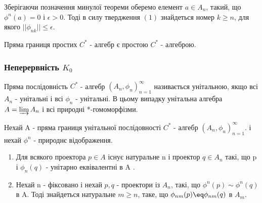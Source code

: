 \begin{remark}
    Зберігаючи позначення минулої теореми оберемо елемент $a \in A_n$, такий, що $\phi^n(a) = 0$ і $\epsilon > 0$.
    Тоді в силу твердження $(1)$ знайдеться номер $k \geq n$, для якого $||\phi_{nk}|| \leq \epsilon$.
\end{remark}

\begin{theorem}
    Пряма границя простих $C^*$ - алгебр є простою $C^*$ - алгеброю.
\end{theorem}

\subsubsection{Неперервність $K_0$}

Пряма послідовність $C^*$ - алгебр $(A_n, \phi_n)_{n=1}^{\infty}$ називається унітальною, якщо всі $A_n$ - унітальні
і всі $\phi_n$ - унітальні.
В цьому випадку унітальна алгебра $A = \varinjlim A_n$ і всі природні *-гомоморфізми.

\begin{lemma}
    Нехай A - пряма границя унітальної послідовності $C^*$ - алгебр $(A_n, \phi_n)_{n=1}^{\infty}$.
    і нехай $\phi^n$ - природнє відображення.
    \begin{enumerate}
        \item Для всякого проектора $p \in A$ існує натуральне n і проектор $q \in A_n$ такі,
        що p і $\phi_n(q)$ - унітарно еквівалентні в A .
        \item Нехай n - фіксовано і нехай $p, q$ - проектори із $A_n$, такі, що $\phi^n(p) \sim \phi^n(q)$ в A.
        Тоді знайдеться натуральне $m \geq n$, таке, що $\phi_{nm}(p) \eq \phi_{nm}(q)$ в $A_m$.
    \end{enumerate}
\end{lemma}


